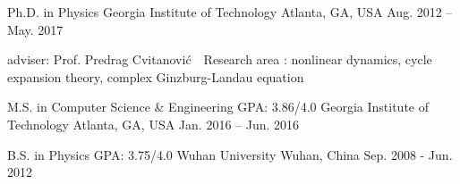 


\begin{cventries}

\cveducation
{Ph.D. in Physics}
{}
{Georgia Institute of Technology}
{Atlanta, GA, USA}
{Aug. 2012 -- May. 2017}
{
  \begin{cvitems}
    \item adviser: Prof. Predrag Cvitanovi\'c \quad \quad 
    \bullet \,\, Research area : nonlinear dynamics, cycle expansion theory,
      complex Ginzburg-Landau equation
  \end{cvitems}
}


\cvmaster
{M.S. in Computer Science \& Engineering }
{GPA: 3.86/4.0}
{Georgia Institute of Technology}
{Atlanta, GA, USA}
{Jan. 2016 -- Jun. 2016}

\cveducation
{B.S. in Physics} %
{GPA: 3.75/4.0}
{Wuhan University} %
{Wuhan, China} %
{Sep. 2008 - Jun. 2012} %
{    
}
\vspace{-0.5em}



\end{cventries}
